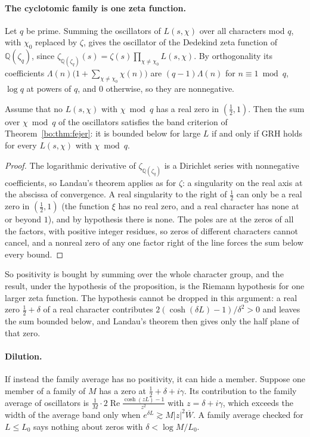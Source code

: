 \paragraph{The cyclotomic family is one zeta function.} Let $q$ be prime. Summing the oscillators of $L(s,\chi)$ over all characters mod $q$, with $\chi_0$ replaced by $\zeta$, gives the oscillator of the Dedekind zeta function of $\mathbb Q(\zeta_q)$, since $\zeta_{\mathbb Q(\zeta_q)}(s)=\zeta(s)\prod_{\chi\ne\chi_0}L(s,\chi)$. By orthogonality its coefficients $\Lambda(n)\bigl(1+\sum_{\chi\ne\chi_0}\chi(n)\bigr)$ are $(q-1)\Lambda(n)$ for $n\equiv1\bmod q$, $\log q$ at powers of $q$, and $0$ otherwise, so they are nonnegative.

\begin{proposition}\label{bo:prop:cyclo}
Assume that no $L(s,\chi)$ with $\chi\bmod q$ has a real zero in $(\frac12,1)$. Then the sum over $\chi\bmod q$ of the oscillators satisfies the band criterion of Theorem~\ref{bo:thm:fejer}: it is bounded below for large $L$ if and only if GRH holds for every $L(s,\chi)$ with $\chi\bmod q$.
\end{proposition}

\begin{proof}
The logarithmic derivative of $\zeta_{\mathbb Q(\zeta_q)}$ is a Dirichlet series with nonnegative coefficients, so Landau's theorem applies as for $\zeta$: a singularity on the real axis at the abscissa of convergence. A real singularity to the right of $\frac12$ can only be a real zero in $(\frac12,1)$ (the function $\xi$ has no real zero, and a real character has none at or beyond $1$), and by hypothesis there is none. The poles are at the zeros of all the factors, with positive integer residues, so zeros of different characters cannot cancel, and a nonreal zero of any one factor right of the line forces the sum below every bound.
\end{proof}

So positivity is bought by summing over the whole character group, and the result, under the hypothesis of the proposition, is the Riemann hypothesis for one larger zeta function. The hypothesis cannot be dropped in this argument: a real zero $\frac12+\delta$ of a real character contributes $2(\cosh(\delta L)-1)/\delta^2>0$ and leaves the sum bounded below, and Landau's theorem then gives only the half plane of that zero.

\paragraph{Dilution.} If instead the family average has no positivity, it can hide a member. Suppose one member of a family of $M$ has a zero at $\frac12+\delta+i\gamma$. Its contribution to the family average of oscillators is $\frac1M\cdot2\operatorname{Re}\frac{\cosh(zL)-1}{z^2}$ with $z=\delta+i\gamma$, which exceeds the width of the average band only when $e^{\delta L}\gtrsim M|z|^2\overline W$. A family average checked for $L\le L_0$ says nothing about zeros with $\delta<\log M/L_0$.

